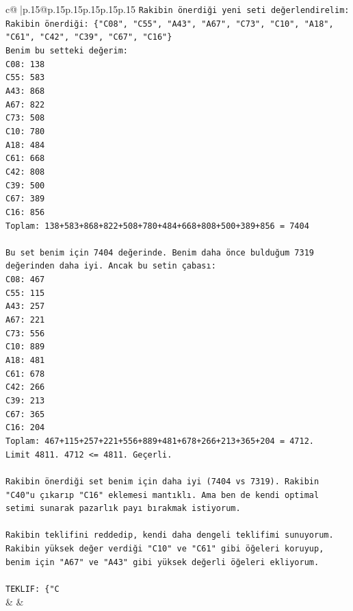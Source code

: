 \documentclass{article}
\begin{document}
{\begin{supertabular}{c@{$\;$}|p{.15\linewidth}@{}p{.15\linewidth}p{.15\linewidth}p{.15\linewidth}p{.15\linewidth}p{.15\linewidth}}
{{{\texttt{Rakibin önerdiği yeni seti değerlendirelim:} \\
\texttt{Rakibin önerdiği: \{"C08", "C55", "A43", "A67", "C73", "C10", "A18", "C61", "C42", "C39", "C67", "C16"\}} \\
\texttt{Benim bu setteki değerim:} \\
\texttt{C08: 138} \\
\texttt{C55: 583} \\
\texttt{A43: 868} \\
\texttt{A67: 822} \\
\texttt{C73: 508} \\
\texttt{C10: 780} \\
\texttt{A18: 484} \\
\texttt{C61: 668} \\
\texttt{C42: 808} \\
\texttt{C39: 500} \\
\texttt{C67: 389} \\
\texttt{C16: 856} \\
\texttt{Toplam: 138+583+868+822+508+780+484+668+808+500+389+856 = 7404} \\
\\ 
\texttt{Bu set benim için 7404 değerinde. Benim daha önce bulduğum 7319 değerinden daha iyi. Ancak bu setin çabası:} \\
\texttt{C08: 467} \\
\texttt{C55: 115} \\
\texttt{A43: 257} \\
\texttt{A67: 221} \\
\texttt{C73: 556} \\
\texttt{C10: 889} \\
\texttt{A18: 481} \\
\texttt{C61: 678} \\
\texttt{C42: 266} \\
\texttt{C39: 213} \\
\texttt{C67: 365} \\
\texttt{C16: 204} \\
\texttt{Toplam: 467+115+257+221+556+889+481+678+266+213+365+204 = 4712.} \\
\texttt{Limit 4811. 4712 <= 4811. Geçerli.} \\
\\ 
\texttt{Rakibin önerdiği set benim için daha iyi (7404 vs 7319). Rakibin "C40"u çıkarıp "C16" eklemesi mantıklı. Ama ben de kendi optimal setimi sunarak pazarlık payı bırakmak istiyorum.} \\
\\ 
\texttt{Rakibin teklifini reddedip, kendi daha dengeli teklifimi sunuyorum. Rakibin yüksek değer verdiği "C10" ve "C61" gibi öğeleri koruyup, benim için "A67" ve "A43" gibi yüksek değerli öğeleri ekliyorum.} \\
\\ 
\texttt{TEKLIF: \{"C} \\
            }
        }
    }
    & & \\ \\


\end{supertabular}}
\end{document}
